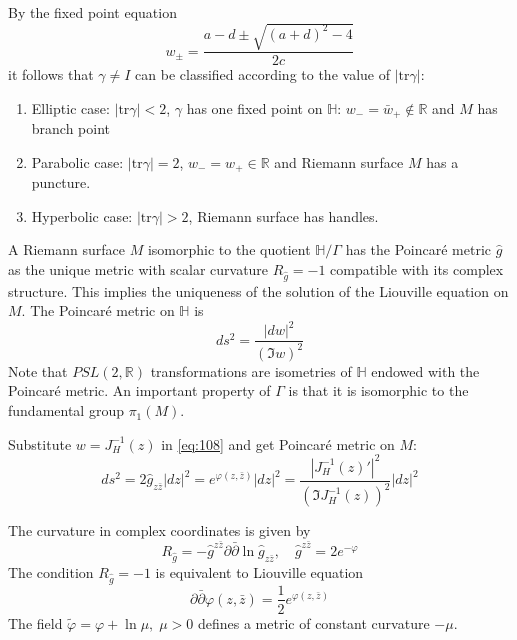 \documentclass[12pt]{article}
\begin{document}
By the fixed point equation
\begin{equation}
  \label{eq:107}
  w_{\pm}=\frac{a-d\pm\sqrt{(a+d)^{2}-4}}{2c}
\end{equation}
it follows that $\gamma\neq I$ can be classified according to the value of $|\mathrm{tr} \gamma|$:
\begin{enumerate}
\item Elliptic case: $|\mathrm{tr} \gamma|<2$, $\gamma$ has one fixed point on $\mathbb{H}$:
  $w_{-}=\bar w_{+}\not\in\mathbb{R}$ and $M$ has branch point
\item Parabolic case: $|\mathrm{tr}\gamma|=2$, $w_{-}=w_{+}\in\mathbb{R}$ and Riemann surface $M$
  has a puncture.
\item Hyperbolic case: $|\mathrm{tr}\gamma|>2$, Riemann surface has handles. 
\end{enumerate}

   A Riemann surface $M$ isomorphic to the quotient $\mathbb{H}/\Gamma$ has the Poincar\'e metric $\hat g$ as the
unique metric with scalar curvature $R_{\hat g} = -1$ compatible with its complex structure. This
implies the uniqueness of the solution of the Liouville equation on $M$. The Poincar\'e metric
on $\mathbb{H}$ is
\begin{equation}
  \label{eq:108}
  ds^{2}=\frac{|dw|^{2}}{(\Im w)^{2}}
\end{equation}
Note that $P SL(2, \mathbb{R})$ transformations are isometries of $\mathbb{H}$ endowed with the Poincar\'e metric.
   An important property of $\Gamma$ is that it is isomorphic to the fundamental group $\pi_{1}(M)$.

Substitute $w=J_{H}^{-1}(z)$ in \eqref{eq:108} and get Poincar\'e metric on $M$:
\begin{equation}
  \label{eq:109}
  ds^{2}=2\hat g_{z\bar z}|dz|^{2}=e^{\varphi(z,\bar z)} |dz|^{2}=\frac{|J_{H}^{-1}(z)'|^{2}}{(\Im
    J_{H}^{-1}(z))^{2}} |dz|^{2}
\end{equation}

The curvature in complex coordinates is given by
\begin{equation}
  \label{eq:110}
  R_{\hat g}=-\hat g^{z\bar z}\partial \bar \partial \ln \hat g_{z\bar z}, \quad \hat g^{z\bar z}=2e^{-\varphi}
\end{equation}
The condition $R_{\hat g}=-1$ is equivalent to Liouville equation
\begin{equation}
  \label{eq:111}
  \partial \bar \partial \varphi(z,\bar z)=\frac{1}{2} e^{\varphi(z,\bar z)}
\end{equation}
The field $\tilde\varphi=\varphi+\ln \mu, \; \mu>0$ defines a metric of constant curvature $-\mu$. 
\end{document}
